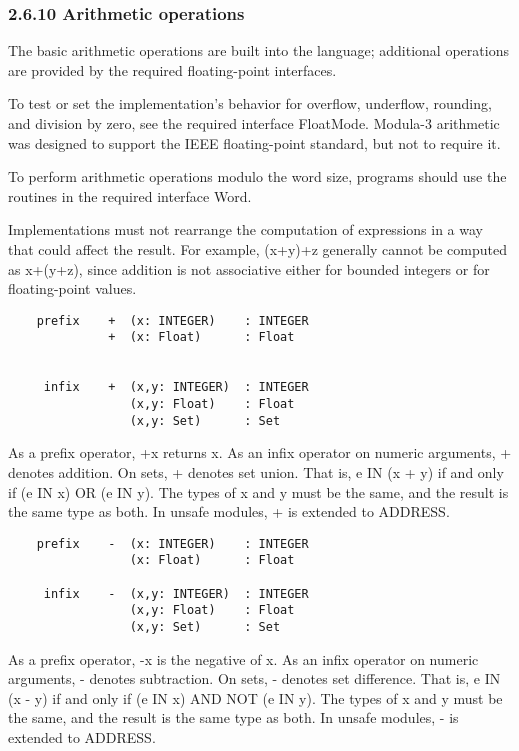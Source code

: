 \documentclass[10pt]{article}
\begin{document}
 
\subsubsection*{2.6.10 Arithmetic operations}


  The basic arithmetic operations are built into the language; additional operations are provided by the required floating-point interfaces. 


  To test or set the implementation's behavior for overflow, underflow, rounding, and division by zero, see the required interface FloatMode. Modula-3 arithmetic was designed to support the IEEE floating-point standard, but not to require it. 


  To perform arithmetic operations modulo the word size, programs should use the routines in the required interface Word. 


  Implementations must not rearrange the computation of expressions in a way that could affect the result. For example, (x+y)+z generally cannot be computed as x+(y+z), since addition is not associative either for bounded integers or for floating-point values. 


  
\begin{verbatim}
    prefix    +  (x: INTEGER)    : INTEGER
              +  (x: Float)      : Float


     infix    +  (x,y: INTEGER)  : INTEGER
                 (x,y: Float)    : Float
                 (x,y: Set)      : Set
\end{verbatim}
  As a prefix operator, +x returns x. As an infix operator on numeric arguments, + denotes addition. On sets, + denotes set union. That is, e IN (x + y) if and only if (e IN x) OR (e IN y). The types of x and y must be the same, and the result is the same type as both. In unsafe modules, + is extended to ADDRESS. 


  
\begin{verbatim}
    prefix    -  (x: INTEGER)    : INTEGER
                 (x: Float)      : Float

     infix    -  (x,y: INTEGER)  : INTEGER
                 (x,y: Float)    : Float
                 (x,y: Set)      : Set
\end{verbatim}
  As a prefix operator, -x is the negative of x. As an infix operator on numeric arguments, - denotes subtraction. On sets, - denotes set difference. That is, e IN (x - y) if and only if (e IN x) AND NOT (e IN y). The types of x and y must be the same, and the result is the same type as both. In unsafe modules, - is extended to ADDRESS. 
\end{document}
